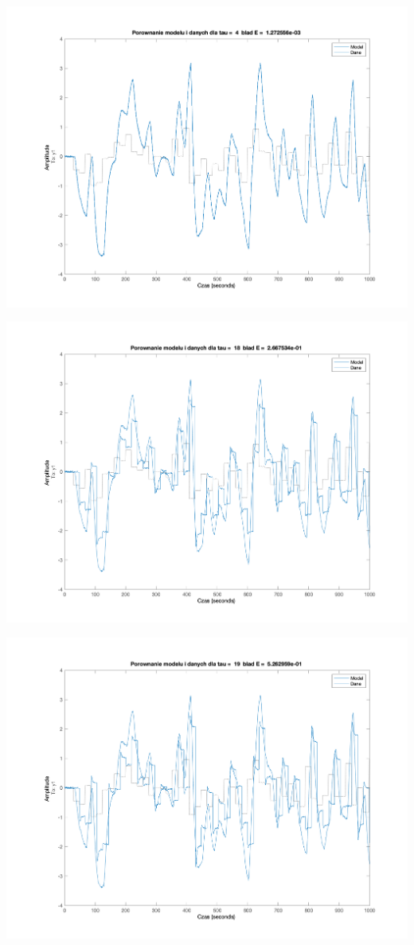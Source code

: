 \documentclass[a4paper, 11pt]{article}
\begin{document}
\begin{enumerate}
 \includegraphics[width=\linewidth]{./ModelsP1/modelTau4.png} 
 
 \includegraphics[width=\linewidth]{./ModelsP1/modelTau18.png} 
 
 \includegraphics[width=\linewidth]{./ModelsP1/modelTau19.png} 
 

\end{enumerate}
\end{document}
